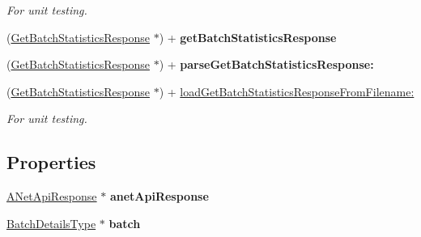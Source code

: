 \begin{DoxyCompactItemize}
\begin{DoxyCompactList}\small\item\em For unit testing. \item\end{DoxyCompactList}\item 
\hypertarget{interface_get_batch_statistics_response_a04b2ce59dfb05054d3b64a9b50474b6c}{
(\hyperlink{interface_get_batch_statistics_response}{GetBatchStatisticsResponse} $\ast$) + {\bfseries getBatchStatisticsResponse}}
\label{interface_get_batch_statistics_response_a04b2ce59dfb05054d3b64a9b50474b6c}

\item 
\hypertarget{interface_get_batch_statistics_response_a5629852beac6c88be8c7c311b1cb399e}{
(\hyperlink{interface_get_batch_statistics_response}{GetBatchStatisticsResponse} $\ast$) + {\bfseries parseGetBatchStatisticsResponse:}}
\label{interface_get_batch_statistics_response_a5629852beac6c88be8c7c311b1cb399e}

\item 
\hypertarget{interface_get_batch_statistics_response_a8a2b7c209f329ac13e0b200237c58461}{
(\hyperlink{interface_get_batch_statistics_response}{GetBatchStatisticsResponse} $\ast$) + \hyperlink{interface_get_batch_statistics_response_a8a2b7c209f329ac13e0b200237c58461}{loadGetBatchStatisticsResponseFromFilename:}}
\label{interface_get_batch_statistics_response_a8a2b7c209f329ac13e0b200237c58461}

\begin{DoxyCompactList}\small\item\em For unit testing. \item\end{DoxyCompactList}\end{DoxyCompactItemize}
\subsection*{Properties}
\begin{DoxyCompactItemize}
\item 
\hypertarget{interface_get_batch_statistics_response_ad87b5fc905d756f894cd7df2ae73ca92}{
\hyperlink{interface_a_net_api_response}{ANetApiResponse} $\ast$ {\bfseries anetApiResponse}}
\label{interface_get_batch_statistics_response_ad87b5fc905d756f894cd7df2ae73ca92}

\item 
\hypertarget{interface_get_batch_statistics_response_a38ad589139190977c300a55b7cee8778}{
\hyperlink{interface_batch_details_type}{BatchDetailsType} $\ast$ {\bfseries batch}}
\label{interface_get_batch_statistics_response_a38ad589139190977c300a55b7cee8778}

\end{DoxyCompactItemize}


